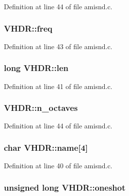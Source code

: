 Definition at line 44 of file amisnd.\+c.

\hypertarget{structVHDR_a5a183e685d444a2ae9faa5db8017fccf}{
\subsubsection[{freq}]{ V\+H\+D\+R\+::freq}}\label{structVHDR_a5a183e685d444a2ae9faa5db8017fccf}


Definition at line 43 of file amisnd.\+c.

\hypertarget{structVHDR_ac9b8a37622e9b8463c7960ad41e50156}{
\subsubsection[{len}]{\setlength{\rightskip}{0pt plus 5cm}long V\+H\+D\+R\+::len}}\label{structVHDR_ac9b8a37622e9b8463c7960ad41e50156}


Definition at line 41 of file amisnd.\+c.

\hypertarget{structVHDR_ac1d13306727d8320558518754ccf4f3b}{
\subsubsection[{n\+\_\+octaves}]{ V\+H\+D\+R\+::n\+\_\+octaves}}\label{structVHDR_ac1d13306727d8320558518754ccf4f3b}


Definition at line 44 of file amisnd.\+c.

\hypertarget{structVHDR_aa4f94382f4d8457e1a0347381cd177ca}{
\subsubsection[{name}]{\setlength{\rightskip}{0pt plus 5cm}char V\+H\+D\+R\+::name\mbox{[}4\mbox{]}}}\label{structVHDR_aa4f94382f4d8457e1a0347381cd177ca}


Definition at line 40 of file amisnd.\+c.

\hypertarget{structVHDR_a089b7a9807d70fd3d3ecf3aee73f0bdb}{
\subsubsection[{oneshot}]{\setlength{\rightskip}{0pt plus 5cm}unsigned long V\+H\+D\+R\+::oneshot}}\label{structVHDR_a089b7a9807d70fd3d3ecf3aee73f0bdb}


